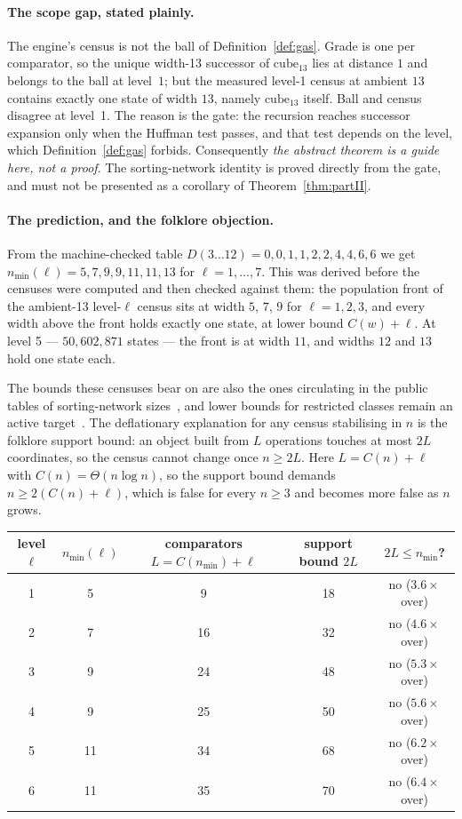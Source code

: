 \documentclass[11pt,a4paper]{article}
\theoremstyle{plain}
\theoremstyle{definition}
\theoremstyle{remark}
\newcommand{\nmin}{n_{\min}}
\newcommand{\cube}{\mathrm{cube}}
\begin{document}
\paragraph{The scope gap, stated plainly.}
The engine's census is not the ball of Definition~\ref{def:gas}. Grade is one
per comparator, so the unique width-13 successor of $\cube_{13}$ lies at
distance $1$ and belongs to the ball at level~$1$; but the measured level-1
census at ambient $13$ contains exactly one state of width $13$, namely
$\cube_{13}$ itself. Ball and census disagree at level~1. The reason is the
gate: the recursion reaches successor expansion only when the Huffman test
passes, and that test depends on the level, which
Definition~\ref{def:gas} forbids. Consequently \emph{the abstract theorem is a
guide here, not a proof}. The sorting-network identity is proved directly from
the gate, and must not be presented as a corollary of
Theorem~\ref{thm:partII}.

\paragraph{The prediction, and the folklore objection.}
From the machine-checked table $D(3\ldots12) = 0,0,1,1,2,2,4,4,6,6$ we get
$\nmin(\ell) = 5,7,9,9,11,11,13$ for $\ell = 1,\dots,7$. This was derived
before the censuses were computed and then checked against them: the population
front of the ambient-13 level-$\ell$ census sits at width $5$, $7$, $9$ for
$\ell = 1,2,3$, and every width above the front holds exactly one state, at
lower bound $C(w)+\ell$. At level 5 --- $50{,}602{,}871$ states --- the front is
at width $11$, and widths $12$ and $13$ hold one state each.

The bounds these censuses bear on are also the ones circulating in the public
tables of sorting-network sizes~\cite{Dobbelaere25}, and lower bounds for
restricted classes remain an active target~\cite{Tozawa26,VV72,FK73}. The
deflationary explanation for any census stabilising in $n$ is the folklore
support bound: an object built from $L$ operations touches at most $2L$
coordinates, so the census cannot change once $n \ge 2L$. Here $L = C(n)+\ell$
with $C(n) = \Theta(n \log n)$, so the support bound demands $n \ge 2(C(n)+\ell)$,
which is false for every $n \ge 3$ and becomes more false as $n$ grows.

\begin{center}
\begin{tabular}{ccccc}
\toprule
level $\ell$ & $\nmin(\ell)$ & comparators $L = C(\nmin)+\ell$ & support bound $2L$ & $2L \le \nmin$? \\
\midrule
1 & 5  & 9  & 18 & no ($3.6\times$ over) \\
2 & 7  & 16 & 32 & no ($4.6\times$ over) \\
3 & 9  & 24 & 48 & no ($5.3\times$ over) \\
4 & 9  & 25 & 50 & no ($5.6\times$ over) \\
5 & 11 & 34 & 68 & no ($6.2\times$ over) \\
6 & 11 & 35 & 70 & no ($6.4\times$ over) \\
\bottomrule
\end{tabular}
\end{center}
\end{document}
